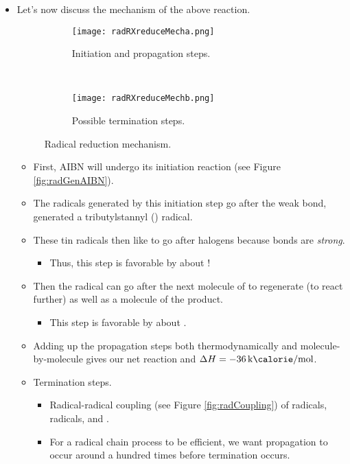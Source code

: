 \documentclass[../notes.tex]{subfiles}
\begin{document}
\begin{itemize}
\begin{itemize}
\begin{itemize}
        \end{itemize}
    \end{itemize}
    \item Let's now discuss the mechanism of the above reaction.
    \begin{figure}[h!]
        \centering
        \begin{subfigure}[b]{\linewidth}
            \centering
            \texttt{[image: radRXreduceMecha.png]}
            \caption{Initiation and propagation steps.}
            \label{fig:radRXreduceMecha}
        \end{subfigure}\\[2em]
        \begin{subfigure}[b]{\linewidth}
            \centering
            \texttt{[image: radRXreduceMechb.png]}
            \caption{Possible termination steps.}
            \label{fig:radRXreduceMechb}
        \end{subfigure}
        \caption{Radical reduction mechanism.}
        \label{fig:radRXreduceMech}
    \end{figure}
    \begin{itemize}
        \item First, AIBN will undergo its initiation reaction (see Figure \ref{fig:radGenAIBN}).
        \item The radicals generated by this initiation step go after the weak  bond, generated a tributylstannyl () radical.
        \item These tin radicals then like to go after halogens because  bonds are \emph{strong}.
        \begin{itemize}
            \item Thus, this step is favorable by about !
        \end{itemize}
        \item Then the  radical can go after the next molecule of  to regenerate  (to react further) as well as a molecule of the  product.
        \begin{itemize}
            \item This step is favorable by about .
        \end{itemize}
        \item Adding up the propagation steps both thermodynamically and molecule-by-molecule gives our net reaction and $\Delta H=-\kcal{36}$.
        \item Termination steps.
        \begin{itemize}
            \item Radical-radical coupling (see Figure \ref{fig:radCoupling}) of  radicals,  radicals, and .
            \item For a radical chain process to be efficient, we want propagation to occur around a hundred times before termination occurs.
        \end{itemize}
    \end{itemize}
\end{itemize}
\end{document}
